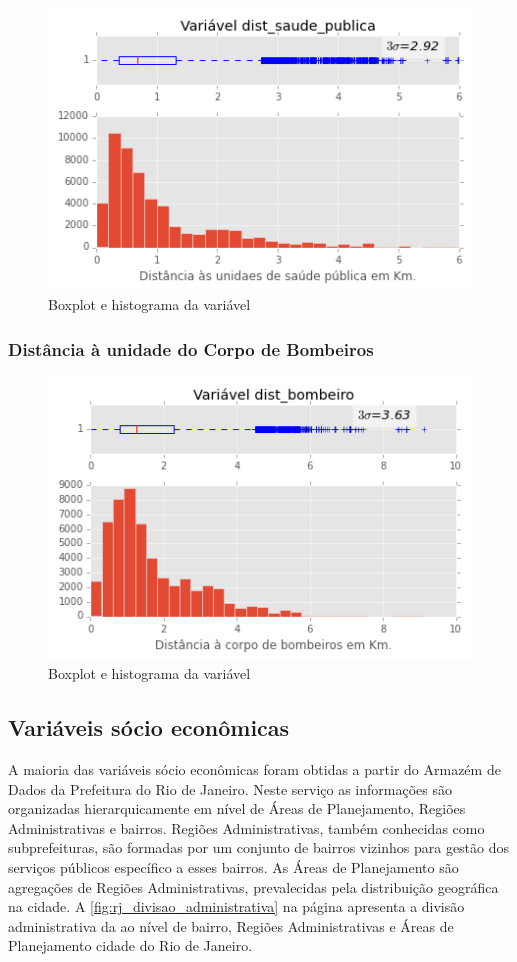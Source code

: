 \begin{figure}[H]
	\centering
	\includegraphics[width=0.8\linewidth]{img/var_dist_saude_publica_boxhist}
	\caption{Boxplot e histograma da variável }
	\label{fig:var_dist_saude_publica_boxhist}
\end{figure} 

\subsubsection{Distância à unidade do Corpo de Bombeiros}

\begin{figure}[H]
	\centering
	\includegraphics[width=0.8\linewidth]{img/var_dist_bombeiro_boxhist}
	\caption{Boxplot e histograma da variável }
	\label{fig:var_dist_bombeiro_boxhist}
\end{figure} 

\subsection{Variáveis sócio econômicas}

A maioria das variáveis sócio econômicas foram obtidas a partir do Armazém de Dados da Prefeitura do Rio de Janeiro. Neste serviço as informações são organizadas hierarquicamente em nível de Áreas de Planejamento, Regiões Administrativas e  bairros. Regiões Administrativas, também conhecidas como subprefeituras, são formadas por um conjunto de bairros vizinhos para gestão dos serviços públicos específico a esses bairros. As Áreas de Planejamento são agregações de Regiões Administrativas, prevalecidas pela distribuição geográfica na cidade. A \cref{fig:rj_divisao_administrativa} na página 	\pageref{fig:rj_divisao_administrativa} apresenta a divisão administrativa da ao nível de bairro, Regiões Administrativas e Áreas de Planejamento cidade do Rio de Janeiro. 


